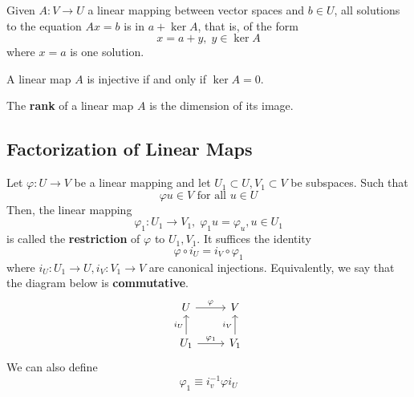   \begin{theorem}
    Given $A: V \longrightarrow U$ a linear mapping between vector spaces and $b \in U$, all solutions to the equation $Ax = b$ is in $a + \ker A$, that is, of the form 
    \begin{equation}
      x = a + y, \; y \in \ker A
    \end{equation}
    where $x = a$ is one solution. 
  \end{theorem}

  \begin{corollary}
    A linear map $A$ is injective if and only if $\ker A = 0$.
  \end{corollary}

  \begin{definition}[Rank]
    The \textbf{rank} of a linear map $A$ is the dimension of its image. 
  \end{definition}

\subsection{Factorization of Linear Maps}

  \begin{definition}[Restriction]
    Let $\varphi: U \longrightarrow V$ be a linear mapping and let $U_1 \subset U, V_1 \subset V$ be subspaces. Such that 
    \begin{equation}
      \varphi u \in V \text{ for all } u \in U
    \end{equation}
    Then, the linear mapping 
    \begin{equation}
      \varphi_1: U_1 \longrightarrow V_1, \; \varphi_1 u = \varphi_u, u \in U_1
    \end{equation}
    is called the \textbf{restriction} of $\varphi$ to $U_1, V_1$. It suffices the identity
    \begin{equation}
      \varphi \circ i_U = i_V \circ \varphi_1
    \end{equation}
    where $i_U: U_1 \longrightarrow U, i_V: V_1 \longrightarrow V$ are canonical injections. Equivalently, we say that the diagram below is \textbf{commutative}. 
    \[
      \begin{tikzcd}
        U \arrow{r}{\varphi} & V \\
        U_1 \arrow{u}{i_U} \arrow{r}{\varphi_1} & V_1 \arrow{u}{i_V}
      \end{tikzcd}
    \]
    We can also define 
    \begin{equation}
      \varphi_1 \equiv i_v^{-1} \varphi i_U
    \end{equation}
  \end{definition}

